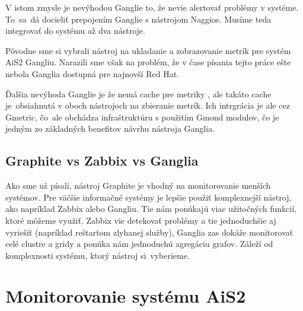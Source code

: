 \documentclass[a4paper, upjsfrontpage, disablespecwarning, thesismargins, thesislinespacing]{rnthesis}
\begin{document}
V istom zmysle je nevýhodou Ganglie to, že nevie alertovať problémy v systéme.
To~sa~dá docieliť prepojením Ganglie s nástrojom Naggios.
Musíme teda integrovať do systému až dva nástroje.

Pôvodne sme si vybrali nástroj na ukladanie a zobrazovanie metrík pre systém AiS2 Gangliu.
Narazili sme však na problém, že v čase písania tejto práce ešte nebola Ganglia dostupná pre najnovší Red Hat.

Ďalšia nevýhoda Ganglie je že nemá cache pre metriky \cite{6}, ale takáto cache je~obsiahnutá v oboch nástrojoch na zbieranie metrík. 
Ich intrgrácia je ale cez Gmetric, čo~ale obchádza infraštruktúru s použitím Gmond modulov, čo je jedným zo základných benefitov návrhu nástroja Ganglia.



\section{Graphite vs Zabbix vs Ganglia}

Ako sme už písali, nástroj Graphite je vhodný na monitorovanie menších systémov.
Pre väčšie informačné systémy je lepšie použiť komplexnejší nástroj, ako napríklad Zab\-bix alebo Gangliu.
Tie nám ponúkajú viac užitočných funkcií, ktoré môžeme využiť.
Zabbix vie detekovať problémy a tie jednoduchšie aj vyriešiť (napríklad reštartom zlyhanej služby), 
	Ganglia zas dokáže monitorovať celé clustre a gridy a ponúka nám jednoduchú agregáciu grafov.
Záleží od komplexnosti systému, ktorý nástroj si~vyberieme.


\chapter{Monitorovanie systému AiS2}

\end{document}
